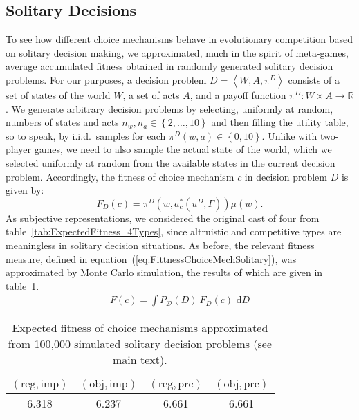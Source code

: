 \documentclass[fleqn,reqno,12pt]{article}
\theoremstyle{Satz}
\theoremstyle{Bsp}
\newcommand{\set}[1]{\left\{#1\right\}}
\newcommand{\tuple}[1]{\left \langle #1\right\rangle}
\newcommand{\Acts}{\ensuremath{A}\xspace}		%
\newcommand{\act}{\ensuremath{a}\xspace}		%
\begin{document}
\subsection{Solitary Decisions}
\label{sec:solitary-decisions}

To see how different choice mechanisms behave in evolutionary competition based on solitary
decision making, we approximated, much in the spirit of meta-games, average accumulated
fitness obtained in randomly generated solitary decision problems. For our purposes, a decision
problem $D=\tuple{W, \Acts, \pi^D}$ consists of a set of states of the world $W$, a set of acts $\Acts$, and
a payoff function $\pi^D: W \times \Acts \rightarrow \mathbb{R}$.  We generate arbitrary
decision problems by selecting, uniformly at random, numbers of states and acts
$n_w, n_\act \in \set{2, \dots, 10}$ and then filling the utility table, so to speak, by
i.i.d.~samples for each $\pi^D(w, \act) \in \set{0, 10}$. Unlike with
two-player games, we need to also sample the actual state of the world, which we selected
uniformly at random from the available states in the current decision problem. Accordingly, the fitness of choice mechanism $c$ in decision problem $D$ is given by:
$$F_D(c)= \pi^D(w,a_c^*(u^D,\Gamma))\mu(w).$$
As subjective representations,
we considered the original cast of four from table~\ref{tab:ExpectedFitness_4Types}, since altruistic and
competitive types are meaningless in solitary decision situations. As before, the
relevant fitness measure, defined in equation~(\ref{eq:FittnessChoiceMechSolitary}), was
approximated by Monte Carlo simulation, the results of which are given in
table~\ref{tab:SolitaryDecisions}.
\begin{align}
  \label{eq:FittnessChoiceMechSolitary}
  F(c) = \int P_{\mathcal{D}}(D) \  F_D(c) \text{ d} D 
\end{align}

\begin{table}
  \centering
  \begin{tabular}{cccc}
    \toprule
   $(\text{reg}, \text{imp})$ 
 & $(\text{obj}, \text{imp})$ 
 & $(\text{reg}, \text{prc})$ 
 & $(\text{obj}, \text{prc})$ 
 \\ \midrule
    6.318 & 6.237 & 6.661 & 6.661 \\ \bottomrule
  \end{tabular}
  \caption{Expected fitness of choice mechanisms approximated from 100,000 simulated solitary
    decision problems (see main text).}
  \label{tab:SolitaryDecisions}
\end{table}
\end{document}
